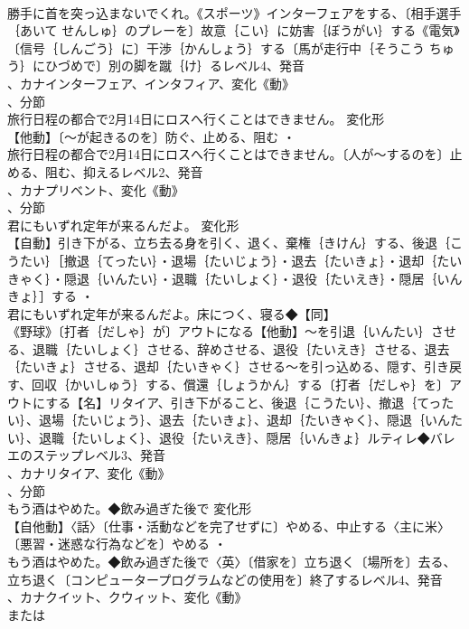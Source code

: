 \documentclass[8pt]{extreport}
\begin{document}
\begin{CJK}{UTF8}{min}
\\	勝手に首を突っ込まないでくれ。《スポーツ》インターフェアをする、〔相手選手｛あいて せんしゅ｝のプレーを〕故意｛こい｝に妨害｛ぼうがい｝する《電気》〔信号｛しんごう｝に〕干渉｛かんしょう｝する〔馬が走行中｛そうこう ちゅう｝にひづめで〕別の脚を蹴｛け｝るレベル4、発音
\\	、カナインターフェア、インタフィア、変化《動》
\\	、分節
\\	旅行日程の都合で2月14日にロスへ行くことはできません。	変化形 
\\	【他動】〔～が起きるのを〕防ぐ、止める、阻む ・
\\	旅行日程の都合で2月14日にロスへ行くことはできません。〔人が～するのを〕止める、阻む、抑えるレベル2、発音
\\	、カナプリベント、変化《動》
\\	、分節
\\	君にもいずれ定年が来るんだよ。	変化形 
\\	【自動】引き下がる、立ち去る身を引く、退く、棄権｛きけん｝する、後退｛こうたい｝［撤退｛てったい｝・退場｛たいじょう｝・退去｛たいきょ｝・退却｛たいきゃく｝・隠退｛いんたい｝・退職｛たいしょく｝・退役｛たいえき｝・隠居｛いんきょ｝］する ・
\\	君にもいずれ定年が来るんだよ。床につく、寝る◆【同】
\\	《野球》〔打者｛だしゃ｝が〕アウトになる【他動】～を引退｛いんたい｝させる、退職｛たいしょく｝させる、辞めさせる、退役｛たいえき｝させる、退去｛たいきょ｝させる、退却｛たいきゃく｝させる～を引っ込める、隠す、引き戻す、回収｛かいしゅう｝する、償還｛しょうかん｝する〔打者｛だしゃ｝を〕アウトにする【名】リタイア、引き下がること、後退｛こうたい｝、撤退｛てったい｝、退場｛たいじょう｝、退去｛たいきょ｝、退却｛たいきゃく｝、隠退｛いんたい｝、退職｛たいしょく｝、退役｛たいえき｝、隠居｛いんきょ｝ルティレ◆バレエのステップレベル3、発音
\\	、カナリタイア、変化《動》
\\	、分節
\\	もう酒はやめた。◆飲み過ぎた後で	変化形 
\\	【自他動】〈話〉〔仕事・活動などを完了せずに〕やめる、中止する〈主に米〉〔悪習・迷惑な行為などを〕やめる ・
\\	もう酒はやめた。◆飲み過ぎた後で〈英〉〔借家を〕立ち退く〔場所を〕去る、立ち退く〔コンピュータープログラムなどの使用を〕終了するレベル4、発音
\\	、カナクイット、クウィット、変化《動》
\\	または

\end{CJK}
\end{document}
